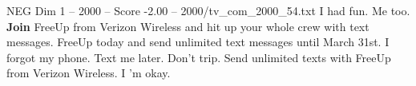\begin{textsample}{NEG Dim 1 – 2000 – Score -2.00 – 2000/tv\_com\_2000\_54.txt}  \label{ex:f1_neg_022}
I had fun.
Me too. \textbf{Join} FreeUp from Verizon Wireless and hit up your whole crew with text messages.
FreeUp today and send unlimited text messages until March 31st.
I forgot my phone.
Text me later.
Don't trip.
Send unlimited texts with FreeUp from Verizon Wireless.
I 'm okay.

\end{textsample}
